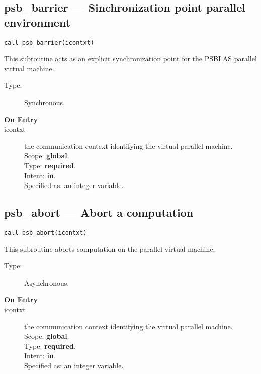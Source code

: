 \clearpage\subsection*{psb\_barrier --- Sinchronization point  parallel
  environment}

\begin{verbatim}
call psb_barrier(icontxt)
\end{verbatim}

This subroutine acts as an explicit synchronization point for  the  PSBLAS
parallel virtual  machine. 
\begin{description}
\item[Type:] Synchronous.
\item[\bf  On Entry ]
\item[icontxt] the communication context identifying the virtual
  parallel machine.\\
Scope: {\bf global}.\\
Type: {\bf required}.\\
Intent: {\bf in}.\\
Specified as: an integer variable.
\end{description}


\clearpage\subsection*{psb\_abort --- Abort a computation}

\begin{verbatim}
call psb_abort(icontxt)
\end{verbatim}

This subroutine aborts computation on the parallel virtual machine. 
\begin{description}
\item[Type:] Asynchronous.
\item[\bf  On Entry ]
\item[icontxt] the communication context identifying the virtual
  parallel machine.\\
Scope: {\bf global}.\\
Type: {\bf required}.\\
Intent: {\bf in}.\\
Specified as: an integer variable.
\end{description}





